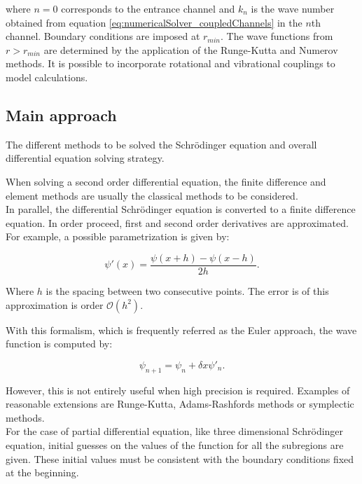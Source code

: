 \documentclass[openany]{book}
\begin{document}
where $n=0$ corresponds to the entrance channel and $k_n$ is the wave number obtained from equation \ref{eq:numericalSolver_coupledChannels} in the $n$th channel. Boundary conditions are imposed at $r_{min}$. The wave functions from $r > r_{min}$ are determined by the application of the  Runge-Kutta and Numerov methods. It is possible to incorporate rotational and vibrational couplings to model calculations.

\subsection{Main approach} \label{sub:diffSolvingMainApproach}

The different methods to be solved the Schrödinger equation and overall differential equation solving strategy. 

When solving a second order differential equation, the finite difference and element methods are usually the classical methods to be considered.  \\

In parallel, the differential Schrödinger equation is converted to a finite difference equation. In order proceed, first and second order derivatives are approximated. For example, a possible parametrization is given by:

\begin{equation}\label{eq:numericalIntegration_central_derivative}
	\psi'(x) = \frac{\psi(x + h) - \psi(x - h)}{2h}. 
\end{equation}

Where $h$ is the spacing between two consecutive points. The error is of this approximation is order $\mathcal{O}(h^2)$. 

With this formalism, which is frequently referred as the Euler approach, the wave function is computed by: 

\begin{equation}\label{eq:numericalIntegration_Euler_approximation}
	\psi_{n+1} = \psi_{n} + \delta x \psi'_{n}.
\end{equation}

However, this is not entirely useful when high precision is required. Examples of reasonable extensions are Runge-Kutta, Adams-Rashfords methods or symplectic methods. \\


For the case of partial differential equation, like three dimensional Schrödinger equation,  initial guesses on the values of the function for all the  subregions are given. These initial values must be consistent with the boundary conditions fixed at the beginning. \\
\end{document}
